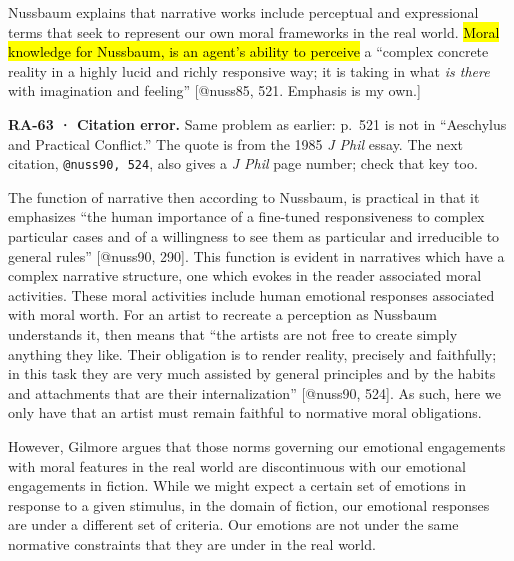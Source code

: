 \documentclass[
  letterpaper,
  DIV=11,
  numbers=noendperiod]{scrartcl}
\theoremstyle{remark}
\begin{document}
Nussbaum explains that narrative works include perceptual and
expressional terms that seek to represent our own moral frameworks in
the real world. \hl{Moral knowledge for Nussbaum, is an agent's ability
to perceive} a ``complex concrete reality in a highly lucid and richly
responsive way; it is taking in what \emph{is there} with imagination
and feeling'' {[}@nuss85, 521. Emphasis is my own.{]}

\begin{tcolorbox}[enhanced jigsaw, arc=.35mm, bottomrule=.15mm, bottomtitle=1mm, breakable, colback=white, colbacktitle=quarto-callout-warning-color!10!white, colframe=quarto-callout-warning-color-frame, coltitle=black, left=2mm, leftrule=.75mm, opacityback=0, opacitybacktitle=0.6, rightrule=.15mm, title=\textcolor{quarto-callout-warning-color}{\faExclamationTriangle}\hspace{0.5em}{Warning}, titlerule=0mm, toprule=.15mm, toptitle=1mm]

\textbf{RA-63 · Citation error.} Same problem as earlier: p.~521 is not
in ``Aeschylus and Practical Conflict.'' The quote is from the 1985
\emph{J Phil} essay. The next citation, \texttt{@nuss90,\ 524}, also
gives a \emph{J Phil} page number; check that key too.

\end{tcolorbox}

The function of narrative then according to Nussbaum, is practical in
that it emphasizes ``the human importance of a fine-tuned responsiveness
to complex particular cases and of a willingness to see them as
particular and irreducible to general rules'' {[}@nuss90, 290{]}. This
function is evident in narratives which have a complex narrative
structure, one which evokes in the reader associated moral activities.
These moral activities include human emotional responses associated with
moral worth. For an artist to recreate a perception as Nussbaum
understands it, then means that ``the artists are not free to create
simply anything they like. Their obligation is to render reality,
precisely and faithfully; in this task they are very much assisted by
general principles and by the habits and attachments that are their
internalization'' {[}@nuss90, 524{]}. As such, here we only have that an
artist must remain faithful to normative moral obligations.

However, Gilmore argues that those norms governing our emotional
engagements with moral features in the real world are discontinuous with
our emotional engagements in fiction. While we might expect a certain
set of emotions in response to a given stimulus, in the domain of
fiction, our emotional responses are under a different set of criteria.
Our emotions are not under the same normative constraints that they are
under in the real world.
\end{document}
